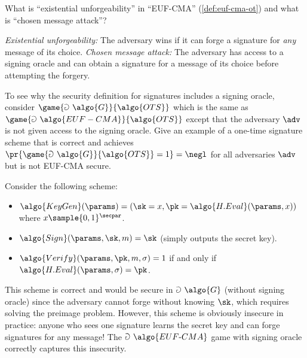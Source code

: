 \begin{exercise}
  What is ``existential unforgeability'' in ``EUF-CMA'' (\autoref{def:euf-cma-ot}) and what is ``chosen message attack''?
\end{exercise}

\ifsolutions
\begin{mysolution}
  \emph{Existential unforgeability:} The adversary wins if it can forge a signature for \emph{any} message of its choice.
  \emph{Chosen message attack:} The adversary has access to a signing oracle and can obtain a signature for a message of its choice before attempting the forgery.
\end{mysolution}
\fi

\begin{exercise}
  To see why the security definition for signatures includes a signing oracle, consider $\game{\Game~\algo{G}}{\algo{OTS}}$ which is the same as $\game{\Game~\algo{EUF-CMA}}{\algo{OTS}}$ except that the adversary $\adv$ is not given access to the signing oracle.
  Give an example of a one-time signature scheme that is correct and achieves $\pr{\game{\Game~\algo{G}}{\algo{OTS}} = 1} = \negl$ for all \ppt adversaries $\adv$ but is not EUF-CMA secure.
\end{exercise}

\ifsolutions
\begin{mysolution}
  Consider the following scheme:
  \begin{itemize}
      \item $\algo{KeyGen}(\params) = (\sk = x, \pk = \algo{H.Eval}(\params, x))$ where $x \sample \{0,1\}^\secpar$.
      \item $\algo{Sign}(\params, \sk, m) = \sk$ (simply outputs the secret key).
      \item $\algo{Verify}(\params, \pk, m, \sigma) = 1$ if and only if $\algo{H.Eval}(\params, \sigma) = \pk$.
  \end{itemize}
  This scheme is correct and would be secure in $\Game~\algo{G}$ (without signing oracle) since the adversary cannot forge without knowing $\sk$, which requires solving the preimage problem.
  However, this scheme is obviously insecure in practice: anyone who sees one signature learns the secret key and can forge signatures for any message!
  The $\Game~\algo{EUF\text{-}CMA}$ game with signing oracle correctly captures this insecurity.
\end{mysolution}
\fi


